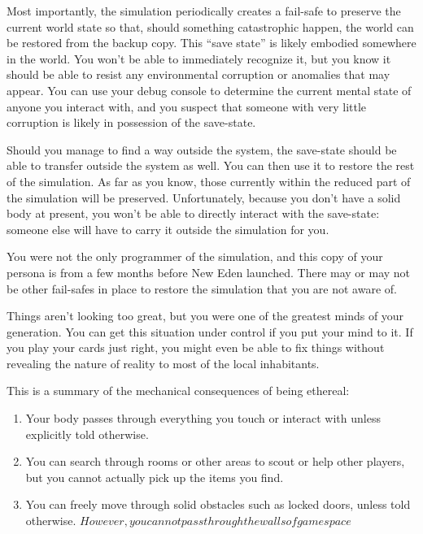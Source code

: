 \documentclass[char]{guildcamp1}
\begin{document}
Most importantly, the simulation periodically creates a fail-safe to preserve the current world state so that, should something catastrophic happen, the world can be restored from the backup copy. This ``save state'' is likely embodied somewhere in the world. You won't be able to immediately recognize it, but you know it should be able to resist any environmental corruption or anomalies that may appear. You can use your debug console to determine the current mental state of anyone you interact with, and you suspect that someone with very little corruption is likely in possession of the save-state.

Should you manage to find a way outside the system, the save-state should be able to transfer outside the system as well. You can then use it to restore the rest of the simulation. As far as you know, those currently within the reduced part of the simulation will be preserved. Unfortunately, because you don't have a solid body at present, you won't be able to directly interact with the save-state: someone else will have to carry it outside the simulation for you.

You were not the only programmer of the simulation, and this copy of your persona is from a few months before New Eden launched. There may or may not be other fail-safes in place to restore the simulation that you are not aware of.

Things aren't looking too great, but you were one of the greatest minds of your generation. You can get this situation under control if you put your mind to it. If you play your cards just right, you might even be able to fix things without revealing the nature of reality to most of the local inhabitants.

This is a summary of the mechanical consequences of being ethereal:
\begin{enumerate}
\item Your body passes through everything you touch or interact with unless explicitly told otherwise.
\item You can search through rooms or other areas to scout or help other players, but you cannot actually pick up the items you find.
\item You can freely move through solid obstacles such as locked doors, unless told otherwise. \(However, you cannot pass through the walls of game space\)
\end{enumerate}
\end{document}
